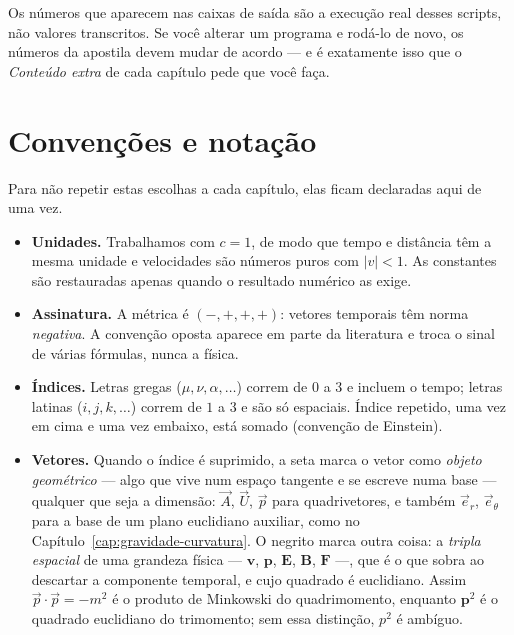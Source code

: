 \documentclass[12pt,a4paper,oneside]{book}
\theoremstyle{rgplain}
\theoremstyle{rgremark}
\begin{document}
Os números que aparecem nas caixas de saída são a execução real desses
scripts, não valores transcritos. Se você alterar um programa e rodá-lo de
novo, os números da apostila devem mudar de acordo --- e é exatamente isso
que o \emph{Conteúdo extra} de cada capítulo pede que você faça.

\section*{Convenções e notação}
{}
\label{sec:convencoes}

Para não repetir estas escolhas a cada capítulo, elas ficam declaradas aqui de
uma vez.

\begin{itemize}[leftmargin=1.4em,itemsep=0.35em]
  \item \textbf{Unidades.} Trabalhamos com $c=1$, de modo que tempo e
  distância têm a mesma unidade e velocidades são números puros com $|v|<1$.
  As constantes são restauradas apenas quando o resultado numérico as exige.

  \item \textbf{Assinatura.} A métrica é $(-,+,+,+)$: vetores temporais têm
  norma \emph{negativa}. A convenção oposta aparece em parte da literatura e
  troca o sinal de várias fórmulas, nunca a física.

  \item \textbf{Índices.} Letras gregas ($\mu,\nu,\alpha,\dots$) correm de $0$
  a $3$ e incluem o tempo; letras latinas ($i,j,k,\dots$) correm de $1$ a $3$ e
  são só espaciais. Índice repetido, uma vez em cima e uma vez embaixo, está
  somado (convenção de Einstein).

  \item \textbf{Vetores.} Quando o índice é suprimido, a seta marca o vetor
  como \emph{objeto geométrico} --- algo que vive num espaço tangente e se
  escreve numa base --- qualquer que seja a dimensão: $\vec A$, $\vec U$,
  $\vec p$ para quadrivetores, e também $\vec e_r$, $\vec e_\theta$ para a
  base de um plano euclidiano auxiliar, como no
  Capítulo~\ref{cap:gravidade-curvatura}. O negrito marca outra coisa: a
  \emph{tripla espacial} de uma grandeza física --- $\bm v$, $\bm p$,
  $\bm E$, $\bm B$, $\bm F$ ---, que é o que sobra ao descartar a componente
  temporal, e cujo quadrado é euclidiano. Assim $\vec p\cdot\vec p=-m^2$ é o
  produto de Minkowski do quadrimomento, enquanto $\bm p^2$ é o quadrado
  euclidiano do trimomento; sem essa distinção, $p^2$ é ambíguo.


\end{itemize}
\end{document}
